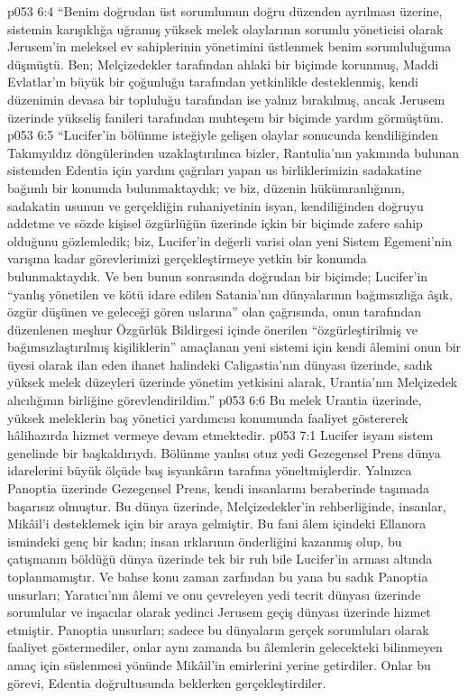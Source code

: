 \vs p053 6:4 “Benim doğrudan üst sorumlumun doğru düzenden ayrılması üzerine, sistemin karışıklığa uğramış yüksek melek olaylarının sorumlu yöneticisi olarak Jerusem’in meleksel ev sahiplerinin yönetimini üstlenmek benim sorumluluğuma düşmüştü. Ben; Melçizedekler tarafından ahlaki bir biçimde korunmuş, Maddi Evlatlar’ın büyük bir çoğunluğu tarafından yetkinlikle desteklenmiş, kendi düzenimin devasa bir topluluğu tarafından ise yalnız bırakılmış, ancak Jerusem üzerinde yükseliş fanileri tarafından muhteşem bir biçimde yardım görmüştüm.
\vs p053 6:5 “Lucifer’in bölünme isteğiyle gelişen olaylar sonucunda kendiliğinden Takımyıldız döngülerinden uzaklaştırılınca bizler, Rantulia’nın yakınında bulunan sistemden Edentia için yardım çağrıları yapan us birliklerimizin sadakatine bağımlı bir konumda bulunmaktaydık; ve biz, düzenin hükümranlığının, sadakatin usunun ve gerçekliğin ruhaniyetinin isyan, kendiliğinden doğruyu addetme ve sözde kişisel özgürlüğün üzerinde içkin bir biçimde zafere sahip olduğunu gözlemledik; biz, Lucifer’in değerli varisi olan yeni Sistem Egemeni’nin varışına kadar görevlerimizi gerçekleştirmeye yetkin bir konumda bulunmaktaydık. Ve ben bunun sonrasında doğrudan bir biçimde; Lucifer’in “yanlış yönetilen ve kötü idare edilen Satania’nın dünyalarının bağımsızlığa âşık, özgür düşünen ve geleceği gören uslarına” olan çağrısında, onun tarafından düzenlenen meşhur Özgürlük Bildirgesi içinde önerilen “özgürleştirilmiş ve bağımsızlaştırılmış kişiliklerin” amaçlanan yeni sistemi için kendi âlemini onun bir üyesi olarak ilan eden ihanet halindeki Caligastia’nın dünyası üzerinde, sadık yüksek melek düzeyleri üzerinde yönetim yetkisini alarak, Urantia’nın Melçizedek alıcılığının birliğine görevlendirildim.”
\vs p053 6:6 Bu melek Urantia üzerinde, yüksek meleklerin baş yönetici yardımcısı konumunda faaliyet göstererek hâlihazırda hizmet vermeye devam etmektedir.
\vs p053 7:1 Lucifer isyanı sistem genelinde bir başkaldırıydı. Bölünme yanlısı otuz yedi Gezegensel Prens dünya idarelerini büyük ölçüde baş isyankârın tarafına yöneltmişlerdir. Yalnızca Panoptia üzerinde Gezegensel Prens, kendi insanlarını beraberinde taşımada başarısız olmuştur. Bu dünya üzerinde, Melçizedekler’in rehberliğinde, insanlar, Mikâil’i desteklemek için bir araya gelmiştir. Bu fani âlem içindeki Ellanora ismindeki genç bir kadın; insan ırklarının önderliğini kazanmış olup, bu çatışmanın böldüğü dünya üzerinde tek bir ruh bile Lucifer’in arması altında toplanmamıştır. Ve bahse konu zaman zarfından bu yana bu sadık Panoptia unsurları; Yaratıcı’nın âlemi ve onu çevreleyen yedi tecrit dünyası üzerinde sorumlular ve inşacılar olarak yedinci Jerusem geçiş dünyası üzerinde hizmet etmiştir. Panoptia unsurları; sadece bu dünyaların gerçek sorumluları olarak faaliyet göstermediler, onlar aynı zamanda bu âlemlerin gelecekteki bilinmeyen amaç için süslenmesi yönünde Mikâil’in emirlerini yerine getirdiler. Onlar bu görevi, Edentia doğrultusunda beklerken gerçekleştirdiler.
